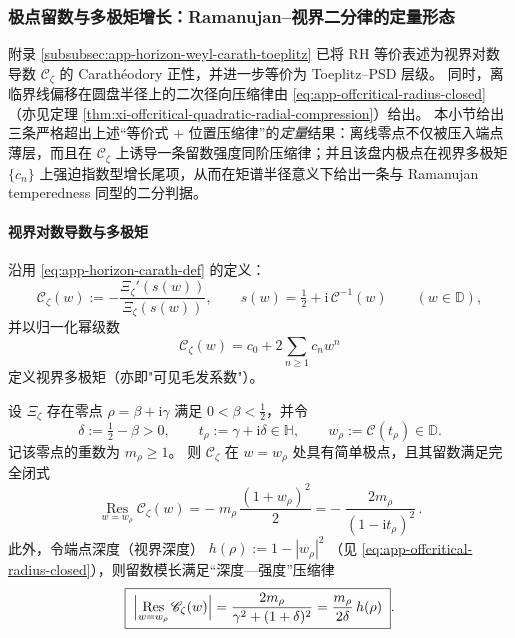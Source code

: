 \subsubsection{极点留数与多极矩增长：Ramanujan--视界二分律的定量形态}\label{subsubsec:xi-horizon-residue-multipole-temperedness}
附录 \ref{subsubsec:app-horizon-weyl-carath-toeplitz} 已将 RH 等价表述为视界对数导数
\(\mathscr{C}_{\zeta}\) 的 Carath\'eodory 正性，并进一步等价为 Toeplitz--PSD 层级。
同时，离临界线偏移在圆盘半径上的二次径向压缩律由 \eqref{eq:app-offcritical-radius-closed}（亦见定理 \ref{thm:xi-offcritical-quadratic-radial-compression}）给出。
本小节给出三条严格超出上述“等价式 + 位置压缩律”的\emph{定量}结果：离线零点不仅被压入端点薄层，而且在 \(\mathscr{C}_{\zeta}\) 上诱导一条留数强度同阶压缩律；并且该盘内极点在视界多极矩 \(\{c_n\}\) 上强迫指数型增长尾项，从而在矩谱半径意义下给出一条与 Ramanujan temperedness 同型的二分判据。

\paragraph{视界对数导数与多极矩}
沿用 \eqref{eq:app-horizon-carath-def} 的定义：
\[
\mathscr{C}_{\zeta}(w):=-\frac{\Xi_{\zeta}'(s(w))}{\Xi_{\zeta}(s(w))},\qquad
s(w)=\tfrac12+\mathrm{i}\,\mathcal{C}^{-1}(w)\qquad(w\in\mathbb{D}),
\]
并以归一化幂级数
\begin{equation}\label{eq:xi-horizon-carath-series-recall}
\mathscr{C}_{\zeta}(w)=c_0+2\sum_{n\ge 1}c_n w^n
\end{equation}
定义视界多极矩（亦即"可见毛发系数"）。
\begin{theorem}\label{thm:xi-horizon-pole-residue-depth-strength}
设 \(\Xi_{\zeta}\) 存在零点 \(\rho=\beta+\mathrm{i}\gamma\) 满足 \(0<\beta<\tfrac12\)，并令
\[
\delta:=\tfrac12-\beta>0,\qquad
t_{\rho}:=\gamma+\mathrm{i}\delta\in\mathbb{H},\qquad
w_{\rho}:=\mathcal{C}(t_{\rho})\in\mathbb{D}.
\]
记该零点的重数为 \(m_{\rho}\ge 1\)。
则 \(\mathscr{C}_{\zeta}\) 在 \(w=w_{\rho}\) 处具有简单极点，且其留数满足完全闭式
\begin{equation}\label{eq:xi-horizon-pole-residue-closed}
\boxed{\;
\operatorname*{Res}_{w=w_{\rho}}\mathscr{C}_{\zeta}(w)
=-\;m_{\rho}\,\frac{(1+w_{\rho})^{2}}{2}
=-\;\frac{2m_{\rho}}{(1-\mathrm{i}t_{\rho})^{2}}\,.
\;}
\end{equation}
此外，令端点深度（视界深度）
\(
h(\rho):=1-|w_{\rho}|^{2}
\)
（见 \eqref{eq:app-offcritical-radius-closed}），则留数模长满足“深度—强度”压缩律
\begin{equation}\label{eq:xi-horizon-depth-strength-law}
\boxed{\;
\Bigl|\operatorname*{Res}_{w=w_{\rho}}\mathscr{C}_{\zeta}(w)\Bigr|
=\frac{2m_{\rho}}{\gamma^{2}+(1+\delta)^{2}}
=\frac{m_{\rho}}{2\delta}\,h(\rho)\; }.
\end{equation}
\end{theorem}

